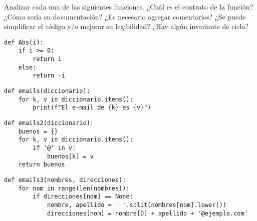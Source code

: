 \begin{ejercicio}
Analizar cada una de las siguientes funciones.
¿Cuál es el contrato de la función? ¿Cómo sería su documentación?
¿Es necesario agregar comentarios?
¿Se puede simplificar el código y/o mejorar su legibilidad?
¿Hay algún invariante de ciclo?

\begin{partes}

\item
\begin{minipage}{0.95\linewidth}
\begin{lstlisting}[numbers=none]
def Abs(i):
    if i >= 0:
        return i
    else:
        return -i
\end{lstlisting}
\end{minipage}

\item
\begin{minipage}{0.95\linewidth}
\begin{lstlisting}[numbers=none]
def emails(diccionario):
    for k, v in diccionario.items():
        print(f"El e-mail de {k} es {v}")
\end{lstlisting}
\end{minipage}

\item
\begin{minipage}{0.95\linewidth}
\begin{lstlisting}[numbers=none]
def emails2(diccionario):
    buenos = {}
    for k, v in diccionario.items():
        if '@' in v:
            buenos[k] = v
    return buenos
\end{lstlisting}
\end{minipage}

\item
\begin{minipage}{0.95\linewidth}
\begin{lstlisting}[numbers=none]
def emails3(nombres, direcciones):
    for nom in range(len(nombres)):
        if direcciones[nom] == None:
            nombre, apellido = ' '.split(nombres[nom].lower())
            direcciones[nom] = nombre[0] + apellido + '@ejemplo.com'
\end{lstlisting}
\end{minipage}

\end{partes}
\end{ejercicio}

